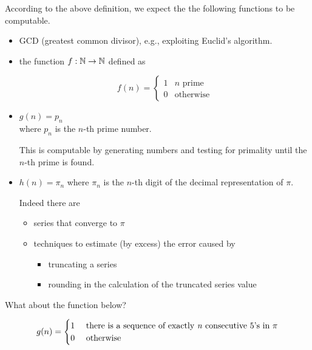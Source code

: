 \begin{example}
  According to the above definition, we expect the the following
  functions to be computable.

  \begin{itemize}

  \item GCD (greatest common divisor), e.g., exploiting Euclid's
    algorithm.

  \item the function $f : \mathbb{N} \to \mathbb{N}$ defined as

    \begin{equation*}
      f(n)=
      \begin{cases}
        1 & n \mbox{ prime} \\
        0 &   \mbox{otherwise}
      \end{cases}
    \end{equation*}

  \item
    $g(n) = p_n$\\
    where $p_n$ is the $n$-th prime number.

    This is computable by generating numbers
    and testing for primality until the $n$-th prime is found.


  \item
    $h(n) = \pi_n$
    where $\pi_n$ is the $n$-th digit of the decimal representation of $\pi$.

    Indeed there are
    \begin{itemize}
    \item series that converge to $\pi$
    \item techniques to estimate (by excess) the error caused by
      \begin{itemize}
      \item truncating a series
      \item rounding in the calculation of the truncated series value
      \end{itemize}
    \end{itemize}
  \end{itemize}
\end{example}

What about the function below?

\begin{equation*}
  g(n) = \begin{cases}
    1 & $ there is a sequence of exactly  \textit{n} consecutive $5$'s in $ \pi \\
    0 & $ otherwise $
	\end{cases}
\end{equation*}

